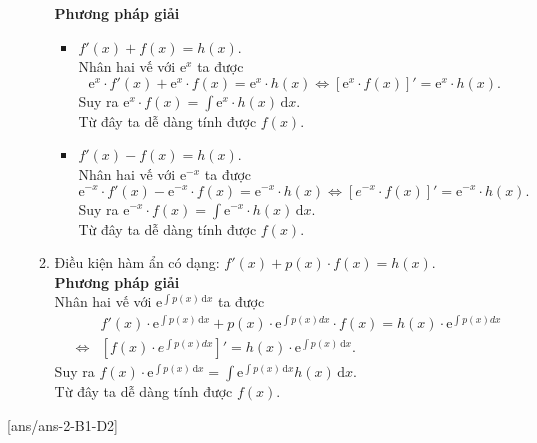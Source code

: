 \begin{dang}{}
\begin{enumerate}
\begin{enumerate}
			\textbf{Phương pháp giải}
			\begin{itemize}
				\item $f'(x)+f(x)=h(x)$.\\
				Nhân hai vế với $\mathrm e^x$ ta được $$\mathrm e^x\cdot f'(x)+\mathrm e^x\cdot f(x)=\mathrm e^x\cdot h(x)\Leftrightarrow \left[\mathrm e^x\cdot f(x)\right]'=\mathrm e^x\cdot h(x).$$
				Suy ra $\mathrm e^x\cdot f(x)=\displaystyle\int \mathrm e^x\cdot h(x) \mathrm{\,d}x$.\\
				Từ đây ta dễ dàng tính được $f(x)$.
				\item $f'(x)-f(x)=h(x)$.\\
				Nhân hai vế với $\mathrm e^{-x}$ ta được $$\mathrm e^{-x}\cdot f'(x)-\mathrm e^{-x}\cdot f(x)=\mathrm e^{-x}\cdot h(x)\Leftrightarrow \left[e^{-x}\cdot f(x)\right]'=\mathrm e^{-x}\cdot h(x).$$
				Suy ra $\mathrm e^{-x}\cdot f(x)=\displaystyle\int \mathrm e^{-x}\cdot h(x) \mathrm{\,d}x$.\\
				Từ đây ta dễ dàng tính được $f(x)$.
			\end{itemize}
			\item Điều kiện hàm ẩn có dạng: $f'(x)+p(x)\cdot f(x)=h(x)$.\\
			\textbf{Phương pháp giải}\\
			Nhân hai vế với $\mathrm e^{\displaystyle\int p (x)\mathrm{\,d}x}$ ta được
			\allowdisplaybreaks
			\begin{eqnarray*}
				& & f'(x)\cdot \mathrm e^{\displaystyle\int p(x)\mathrm{\,d}x}+p(x)\cdot \mathrm e^{\displaystyle\int p (x)dx}\cdot f(x)=h(x)\cdot{\mathrm e^{\displaystyle\int p (x)dx}}\\
				&\Leftrightarrow& \left[f(x)\cdot{e^{\displaystyle\int p (x)dx}}\right]'=h(x)\cdot \mathrm e^{\displaystyle\int p (x)\mathrm{\,d} x}.
			\end{eqnarray*}		
			Suy ra $f(x)\cdot \mathrm e^{\displaystyle\int p(x)\mathrm{\,d}x}=\displaystyle\int \mathrm e^{\displaystyle\int p (x)\mathrm{\,d}x}h(x) \mathrm{\,d}x$.\\
			Từ đây ta dễ dàng tính được $f(x)$.
		\end{enumerate}
	\end{enumerate}
\end{dang}
[ans/ans-2-B1-D2]
\TN
